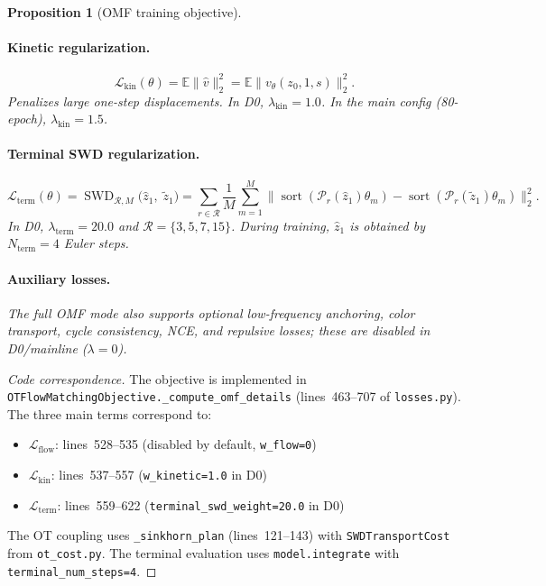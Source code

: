 \documentclass[letterpaper]{article}
\newtheorem{proposition}{Proposition}[section]
\newcommand{\E}{\mathbb{E}}
\newcommand{\SWD}{\operatorname{SWD}}
\newcommand{\cL}{\mathcal{L}}
\newcommand{\cP}{\mathcal{P}}
\newcommand{\sort}{\operatorname{sort}}
\begin{document}
\begin{proposition}[OMF training objective]
\paragraph{Kinetic regularization.}
\begin{equation}
    \cL_{\text{kin}}(\theta) = \E\bigl\| \hat v \bigr\|_2^2 = \E\bigl\| v_\theta(z_0, 1, s) \bigr\|_2^2.
    \label{eq:kin_loss}
\end{equation}
Penalizes large one-step displacements. In D0, $\lambda_{\text{kin}}=1.0$.
In the main config (80-epoch), $\lambda_{\text{kin}}=1.5$.

\paragraph{Terminal SWD regularization.}
\begin{equation}
    \cL_{\text{term}}(\theta) = \SWD_{\mathcal{R},M}\bigl(\hat z_1,\; \tilde z_1\bigr)
    = \sum_{r\in\mathcal{R}}\frac{1}{M}\sum_{m=1}^M
    \bigl\| \sort(\cP_r(\hat z_1)\theta_m) - \sort(\cP_r(\tilde z_1)\theta_m) \bigr\|_2^2.
    \label{eq:term_loss}
\end{equation}
In D0, $\lambda_{\text{term}}=20.0$ and $\mathcal{R}=\{3,5,7,15\}$.
During training, $\hat z_1$ is obtained by $N_{\text{term}}=4$ Euler steps.

\paragraph{Auxiliary losses.}
The full OMF mode also supports optional low-frequency anchoring,
color transport, cycle consistency, NCE, and repulsive losses;
these are disabled in D0/mainline ($\lambda=0$).
\end{proposition}

\begin{proof}[Code correspondence]
The objective is implemented in \texttt{OTFlowMatchingObjective.\_compute\_omf\_details}
(lines~463--707 of \texttt{losses.py}). The three main terms correspond to:
\begin{itemize}[nosep]
    \item $\cL_{\text{flow}}$: lines~528--535 (disabled by default, \texttt{w\_flow=0})
    \item $\cL_{\text{kin}}$: lines~537--557 (\texttt{w\_kinetic=1.0} in D0)
    \item $\cL_{\text{term}}$: lines~559--622 (\texttt{terminal\_swd\_weight=20.0} in D0)
\end{itemize}
The OT coupling uses \texttt{\_sinkhorn\_plan} (lines~121--143) with
\texttt{SWDTransportCost} from \texttt{ot\_cost.py}.
The terminal evaluation uses \texttt{model.integrate} with
\texttt{terminal\_num\_steps=4}.
\end{proof}
\end{document}
